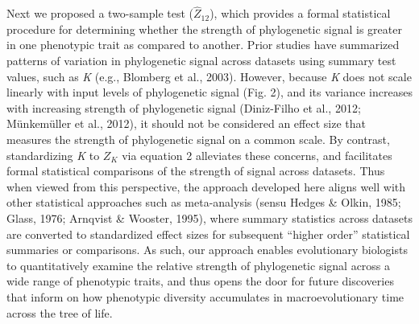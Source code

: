 \documentclass[
]{article}
\begin{document}
Next we proposed a two-sample test (\(\hat{Z}_{12}\)), which provides a
formal statistical procedure for determining whether the strength of
phylogenetic signal is greater in one phenotypic trait as compared to
another. Prior studies have summarized patterns of variation in
phylogenetic signal across datasets using summary test values, such as
\emph{K} (e.g., Blomberg et al., 2003). However, because \emph{K} does
not scale linearly with input levels of phylogenetic signal (Fig. 2),
and its variance increases with increasing strength of phylogenetic
signal (Diniz-Filho et al., 2012; Münkemüller et al., 2012), it should
not be considered an effect size that measures the strength of
phylogenetic signal on a common scale. By contrast, standardizing
\emph{K} to \(Z_K\) via equation 2 alleviates these concerns, and
facilitates formal statistical comparisons of the strength of signal
across datasets. Thus when viewed from this perspective, the approach
developed here aligns well with other statistical approaches such as
meta-analysis (sensu Hedges \& Olkin, 1985; Glass, 1976; Arnqvist \&
Wooster, 1995), where summary statistics across datasets are converted
to standardized effect sizes for subsequent ``higher order'' statistical
summaries or comparisons. As such, our approach enables evolutionary
biologists to quantitatively examine the relative strength of
phylogenetic signal across a wide range of phenotypic traits, and thus
opens the door for future discoveries that inform on how phenotypic
diversity accumulates in macroevolutionary time across the tree of life.
\hfill\break
\end{document}

